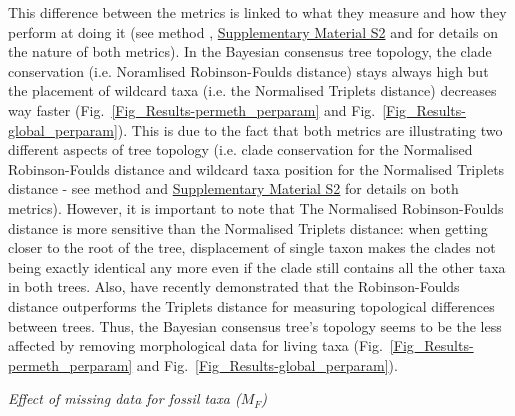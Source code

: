 \documentclass[12pt,letterpaper]{article}
\renewcommand{\subsection}[1]{%
\bigskip
\begin{center}
\begin{large}
\normalfont\itshape #1
\end{large}
\end{center}}
\begin{document}
This difference between the metrics is linked to what they measure and how they perform at doing it (see method %
, \hyperref[SupplementaryMaterial]{Supplementary Material S2} and \citealt{kuhnerpractical2014} for details on the nature of both metrics). In the Bayesian consensus tree topology, the clade conservation (i.e. Noramlised Robinson-Foulds distance) stays always high but the placement of wildcard taxa (i.e. the Normalised Triplets distance) decreases way faster (Fig.~\ref{Fig_Results-permeth_perparam} and Fig.~\ref{Fig_Results-global_perparam}). This is due to the fact that both metrics are illustrating two different aspects of tree topology (i.e. clade conservation for the Normalised Robinson-Foulds distance and wildcard taxa position for the Normalised Triplets distance - see method %
and \hyperref[SupplementaryMaterial]{Supplementary Material S2} for details on both metrics). However, it is important to note that The Normalised Robinson-Foulds distance is more sensitive than the Normalised Triplets distance: when getting closer to the root of the tree, displacement of single taxon makes the clades not being exactly identical any more even if the clade still contains all the other taxa in both trees. Also, \citet{kuhnerpractical2014} have recently demonstrated that the Robinson-Foulds distance outperforms the Triplets distance for measuring topological differences between trees. Thus, the Bayesian consensus tree's topology seems to be the less affected by removing morphological data for living taxa (Fig.~\ref{Fig_Results-permeth_perparam} and Fig.~\ref{Fig_Results-global_perparam}).

\subsection{Effect of missing data for fossil taxa ($M_{F}$)}
\end{document}
